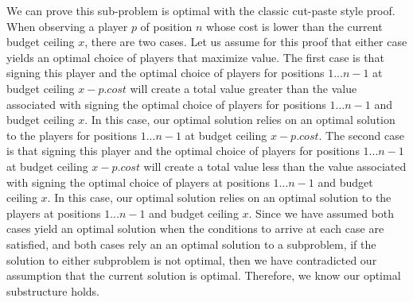 \documentclass[11pt]{article}
\begin{document}
We can prove this sub-problem is optimal with the classic cut-paste style proof. When observing a player $p$ of position $n$ whose cost is lower than the current budget ceiling $x$, there are two cases. Let us assume for this proof that either case yields an optimal choice of players that maximize value. The first case is that signing this player and the optimal choice of players for positions $1...n-1$ at budget ceiling $x - p.cost$ will create a total value greater than the value associated with signing the optimal choice of players for positions $1...n-1$ and budget ceiling $x$. In this case, our optimal solution relies on an optimal solution to the players for positions $1...n-1$ at budget ceiling $x - p.cost$. The second case is that signing this player and the optimal choice of players for positions $1...n-1$ at budget ceiling $x - p.cost$ will create a total value less than the value associated with signing the optimal choice of players at positions $1...n-1$ and budget ceiling $x$. In this case, our optimal solution relies on an optimal solution to the players at positions $1...n-1$ and budget ceiling $x$. Since we have assumed both cases yield an optimal solution when the conditions to arrive at each case are satisfied, and both cases rely an an optimal solution to a subproblem, if the solution to either subproblem is not optimal, then we have contradicted our assumption that the current solution is optimal. Therefore, we know our optimal substructure holds.
\end{document}
